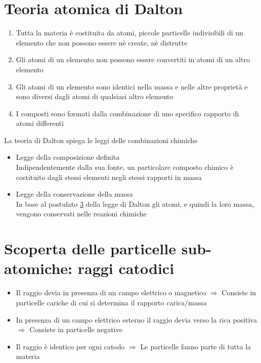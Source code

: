 \documentclass[a4paper,11pt]{report}
\begin{document}
\section{Teoria atomica di Dalton}
\begin{enumerate}
	\item Tutta la materia è costituita da atomi, piccole particelle indivisibili di un elemento che non possono essere nè create, nè distrutte
	\item Gli atomi di un elemento non possono essere convertiti in atomi di un altro elemento
	\item Gli atomi di un elemento sono identici nella massa e nelle altre proprietà e sono diversi dagli atomi di qualsiasi altro elemento \label{3}
	\item I composti sono formati dalla combinazione di uno specifico rapporto di atomi differenti
\end{enumerate}
\noindent La teoria di Dalton spiega le leggi delle combinazioni chimiche
\begin{itemize}
	\item Legge della composizione definita \hfil\\
	Indipendentemente dalla sua fonte, un particolare composto chimico è costituito dagli stessi elementi negli stessi rapporti in massa
	\item Legge della conservazione della massa \hfill\\
	In base al postulato \hyperref[3]{3} della legge di Dalton gli atomi, e quindi la loro massa, vengono conservati nelle reazioni chimiche
\end{itemize}
\section{Scoperta delle particelle sub-atomiche: raggi catodici}
\begin{itemize}
	\item Il raggio devia in presenza di un campo elettrico o magnetico $\Rightarrow$ Consiste in particelle cariche di cui si determina il rapporto carica/massa
	\item In presenza di un campo elettrico esterno il raggio devia verso la rica positiva $\Rightarrow$ Consiste in particelle negative
	\item Il raggio è identico per ogni catodo $\Rightarrow$ Le particelle fanno parte di tutta la materia
\end{itemize}
\end{document}
